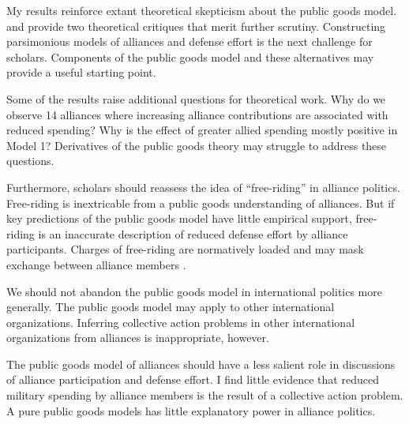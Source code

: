 \documentclass[12pt]{article}
\begin{document}
My results reinforce extant theoretical skepticism about the public goods model. 
\citet{Palmer1990} and \citet{SandlerHartley2001} provide two theoretical critiques that merit further scrutiny. 
Constructing parsimonious models of alliances and defense effort is the next challenge for scholars. 
Components of the public goods model and these alternatives may provide a useful starting point. 


Some of the results raise additional questions for theoretical work. 
Why do we observe 14 alliances where increasing alliance contributions are associated with reduced spending?
Why is the effect of greater allied spending mostly positive in Model 1? 
Derivatives of the public goods theory may struggle to address these questions. 


Furthermore, scholars should reassess the idea of ``free-riding'' in alliance politics. 
Free-riding is inextricable from a public goods understanding of alliances.
But if key predictions of the public goods model have little empirical support, free-riding is an inaccurate description of reduced defense effort by alliance participants.  
Charges of free-riding are normatively loaded and may mask exchange between alliance members \citep{Lanoszka2015}. 


We should not abandon the public goods model in international politics more generally. 
The public goods model may apply to other international organizations. 
Inferring collective action problems in other international organizations from alliances is inappropriate, however. 


The public goods model of alliances should have a less salient role in discussions of alliance participation and defense effort. 
I find little evidence that reduced military spending by alliance members is the result of a collective action problem. 
A pure public goods models has little explanatory power in alliance politics. 



\singlespace


%  
 
\end{document}
